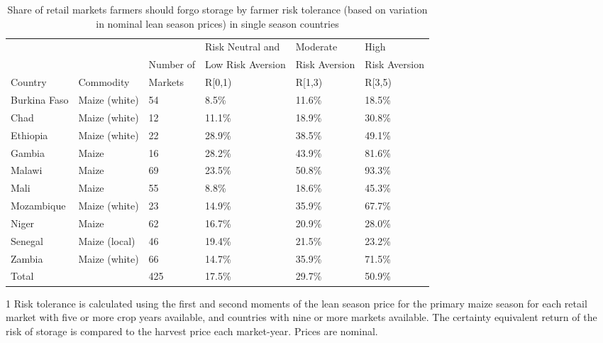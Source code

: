 \begin{table}[ht]
	\begin{threeparttable}[t]
		\centering
		\caption{Share of retail markets farmers should forgo storage by farmer risk tolerance (based on variation in nominal lean season prices) in single season countries}
		\label{tab:risk_price}
		\begin{tabular}{|lll|lll|}
			\hline 
			&   & & Risk Neutral and & Moderate & High \\ 
			& & Number of  & Low Risk Aversion & Risk Aversion &  Risk Aversion\\ 
			Country& Commodity & Markets& R\in[0,1) &  R\in[1,3) & R\in[3,5) \\ 
			\hline
Burkina Faso & Maize (white) & 54 & 8.5\% & 11.6\% & 18.5\% \\ 
  Chad & Maize (white) & 12 & 11.1\% & 18.9\% & 30.8\% \\ 
  Ethiopia & Maize (white) & 22 & 28.9\% & 38.5\% & 49.1\% \\ 
  Gambia & Maize & 16 & 28.2\% & 43.9\% & 81.6\% \\ 
  Malawi & Maize & 69 & 23.5\% & 50.8\% & 93.3\% \\ 
  Mali & Maize & 55 & 8.8\% & 18.6\% & 45.3\% \\ 
  Mozambique & Maize (white) & 23 & 14.9\% & 35.9\% & 67.7\% \\ 
  Niger & Maize & 62 & 16.7\% & 20.9\% & 28.0\% \\ 
  Senegal & Maize (local) & 46 & 19.4\% & 21.5\% & 23.2\% \\ 
  Zambia & Maize (white) & 66 & 14.7\% & 35.9\% & 71.5\% \\ 
  \hline
  Total &  & 425 & 17.5\% & 29.7\% & 50.9\% \\ 
   \hline 
\end{tabular}
\begin{tablenotes}
\item [1] \footnotesize Risk tolerance is calculated using the first and second moments of the lean season price for the primary maize season for each retail market with five or more crop years available, and countries with nine or more markets available. The certainty equivalent return of the risk of storage is compared to the harvest price each market-year. Prices are nominal.
\end{tablenotes}
\end{threeparttable}
\end{table}
